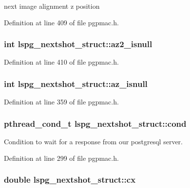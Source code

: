 next image alignment z position 



Definition at line 409 of file pgpmac.\-h.

\hypertarget{structlspg__nextshot__struct_a95d080f13a4e02b9aa883821ee3e721c}{
\subsubsection[{az2\-\_\-isnull}]{\setlength{\rightskip}{0pt plus 5cm}int lspg\-\_\-nextshot\-\_\-struct\-::az2\-\_\-isnull}}\label{structlspg__nextshot__struct_a95d080f13a4e02b9aa883821ee3e721c}


Definition at line 410 of file pgpmac.\-h.

\hypertarget{structlspg__nextshot__struct_aaebd6d432810313294b5fed5f4445cb1}{
\subsubsection[{az\-\_\-isnull}]{\setlength{\rightskip}{0pt plus 5cm}int lspg\-\_\-nextshot\-\_\-struct\-::az\-\_\-isnull}}\label{structlspg__nextshot__struct_aaebd6d432810313294b5fed5f4445cb1}


Definition at line 359 of file pgpmac.\-h.

\hypertarget{structlspg__nextshot__struct_afc773a9eefc173aa98d5c2889e1d7669}{
\subsubsection[{cond}]{\setlength{\rightskip}{0pt plus 5cm}pthread\-\_\-cond\-\_\-t lspg\-\_\-nextshot\-\_\-struct\-::cond}}\label{structlspg__nextshot__struct_afc773a9eefc173aa98d5c2889e1d7669}


Condition to wait for a response from our postgresql server. 



Definition at line 299 of file pgpmac.\-h.

\hypertarget{structlspg__nextshot__struct_ad9eb2013fa6f295f72f0891fe98c863f}{
\subsubsection[{cx}]{\setlength{\rightskip}{0pt plus 5cm}double lspg\-\_\-nextshot\-\_\-struct\-::cx}}\label{structlspg__nextshot__struct_ad9eb2013fa6f295f72f0891fe98c863f}


